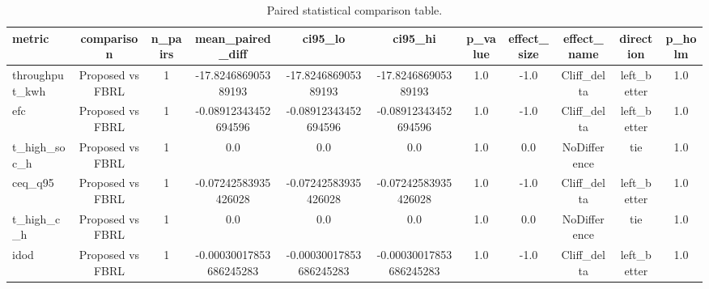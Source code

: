 \begin{table}[t]
\centering
\caption{Paired statistical comparison table.}
\label{tab:stats_auto}
\begin{tabular}{lcccccccccc}
\toprule
metric & comparison & n\_pairs & mean\_paired\_diff & ci95\_lo & ci95\_hi & p\_value & effect\_size & effect\_name & direction & p\_holm \\
\midrule
throughput\_kwh & Proposed vs FBRL & 1 & -17.824686905389193 & -17.824686905389193 & -17.824686905389193 & 1.0 & -1.0 & Cliff\_delta & left\_better & 1.0 \\
efc & Proposed vs FBRL & 1 & -0.08912343452694596 & -0.08912343452694596 & -0.08912343452694596 & 1.0 & -1.0 & Cliff\_delta & left\_better & 1.0 \\
t\_high\_soc\_h & Proposed vs FBRL & 1 & 0.0 & 0.0 & 0.0 & 1.0 & 0.0 & NoDifference & tie & 1.0 \\
ceq\_q95 & Proposed vs FBRL & 1 & -0.07242583935426028 & -0.07242583935426028 & -0.07242583935426028 & 1.0 & -1.0 & Cliff\_delta & left\_better & 1.0 \\
t\_high\_c\_h & Proposed vs FBRL & 1 & 0.0 & 0.0 & 0.0 & 1.0 & 0.0 & NoDifference & tie & 1.0 \\
idod & Proposed vs FBRL & 1 & -0.00030017853686245283 & -0.00030017853686245283 & -0.00030017853686245283 & 1.0 & -1.0 & Cliff\_delta & left\_better & 1.0 \\
\bottomrule
\end{tabular}
\end{table}